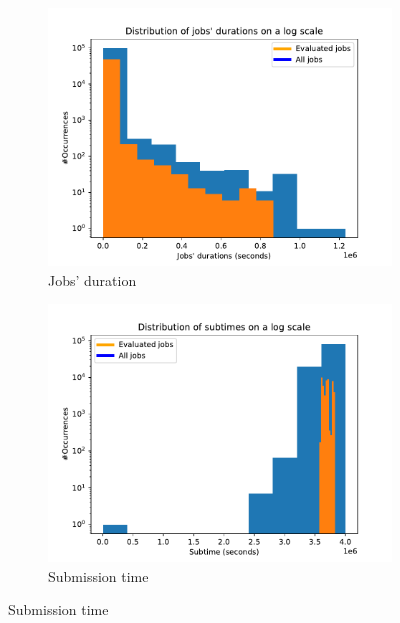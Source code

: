 \documentclass[a4paper]{article}
\begin{document}
\begin{figure}[H]\centering
\begin{subfigure}[b]{0.4\linewidth}\centering\includegraphics[width=1\linewidth]{MBSS/plot/Distribution/2022-01-17->2022-01-19_delay.pdf}\caption{Jobs' duration}\label{38}\end{subfigure}
\begin{subfigure}[b]{0.4\linewidth}\centering\includegraphics[width=1\linewidth]{MBSS/plot/Distribution/2022-01-17->2022-01-19_subtime.pdf}\caption{Submission time}\label{39}\end{subfigure}

\end{figure}
\end{document}
